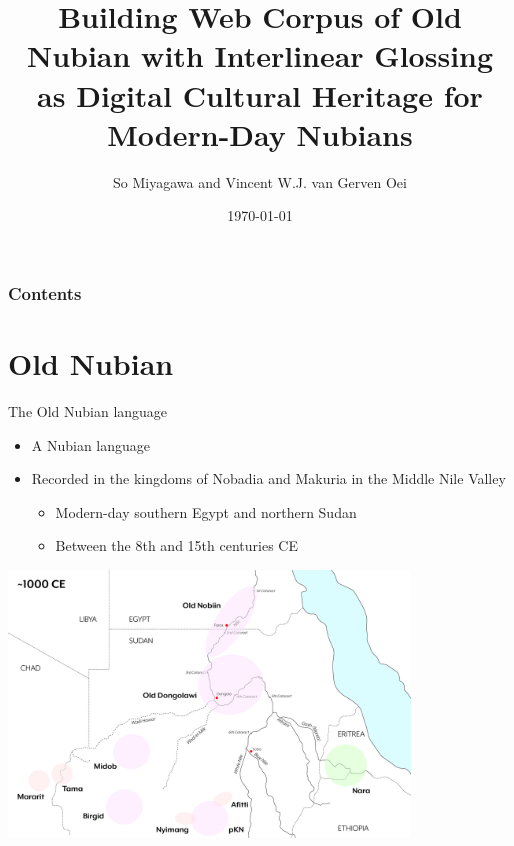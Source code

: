 \documentclass{beamer}
\title[Building Web Corpus of Old Nubian with Interlinear Glossing by Miyagaw and van Gerven Oei, JADH2021]{Building Web Corpus of Old Nubian with Interlinear Glossing as Digital Cultural Heritage for Modern-Day Nubians}
\author[]{So Miyagawa and Vincent W.J. van Gerven Oei}
\institute[]{Kyoto University, Punctum Books \& Coventry University}
\date{\today}
\begin{document}
\begin{frame}
\titlepage %
\end{frame}

\begin{frame}\frametitle{Contents}
	\tableofcontents %
\end{frame}

\section{Old Nubian}

\begin{frame}{The Old Nubian language}
  \begin{itemize}
    \item A Nubian language
    \item Recorded in the kingdoms of Nobadia and Makuria in the Middle Nile Valley 
    \begin{itemize}
      \item Modern-day southern Egypt and northern Sudan
      \item Between the 8th and 15th centuries CE 
    \end{itemize}
  \end{itemize}
 \begin{center}
\includegraphics[width=0.8\textwidth]{1000CE.png}
\end{center}
\end{frame}
\end{document}
